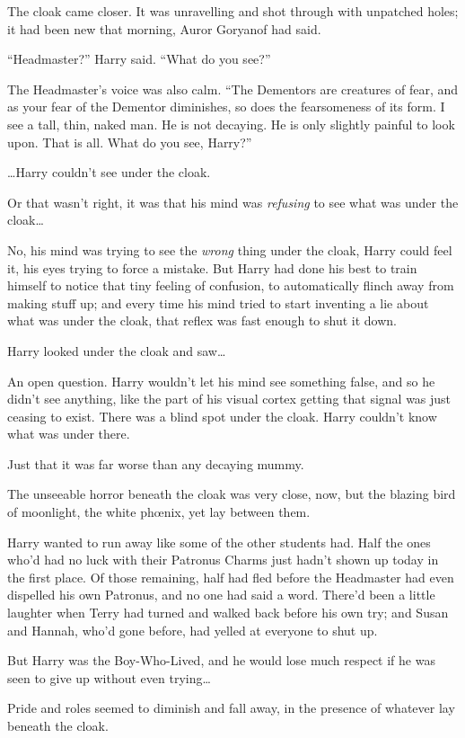 The cloak came closer. It was unravelling and shot through with unpatched holes; it had been new that morning, Auror Goryanof had said.

“Headmaster?” Harry said. “What do you see?”

The Headmaster’s voice was also calm. “The Dementors are creatures of fear, and as your fear of the Dementor diminishes, so does the fearsomeness of its form. I see a tall, thin, naked man. He is not decaying. He is only slightly painful to look upon. That is all. What do you see, Harry?”

…Harry couldn’t see under the cloak.

Or that wasn’t right, it was that his mind was \emph{refusing} to see what was under the cloak…

No, his mind was trying to see the \emph{wrong} thing under the cloak, Harry could feel it, his eyes trying to force a mistake. But Harry had done his best to train himself to notice that tiny feeling of confusion, to automatically flinch away from making stuff up; and every time his mind tried to start inventing a lie about what was under the cloak, that reflex was fast enough to shut it down.

Harry looked under the cloak and saw…

An open question. Harry wouldn’t let his mind see something false, and so he didn’t see anything, like the part of his visual cortex getting that signal was just ceasing to exist. There was a blind spot under the cloak. Harry couldn’t know what was under there.

Just that it was far worse than any decaying mummy.

The unseeable horror beneath the cloak was very close, now, but the blazing bird of moonlight, the white phœnix, yet lay between them.

Harry wanted to run away like some of the other students had. Half the ones who’d had no luck with their Patronus Charms just hadn’t shown up today in the first place. Of those remaining, half had fled before the Headmaster had even dispelled his own Patronus, and no one had said a word. There’d been a little laughter when Terry had turned and walked back before his own try; and Susan and Hannah, who’d gone before, had yelled at everyone to shut up.

But Harry was the Boy-Who-Lived, and he would lose much respect if he was seen to give up without even trying…

Pride and roles seemed to diminish and fall away, in the presence of whatever lay beneath the cloak.

